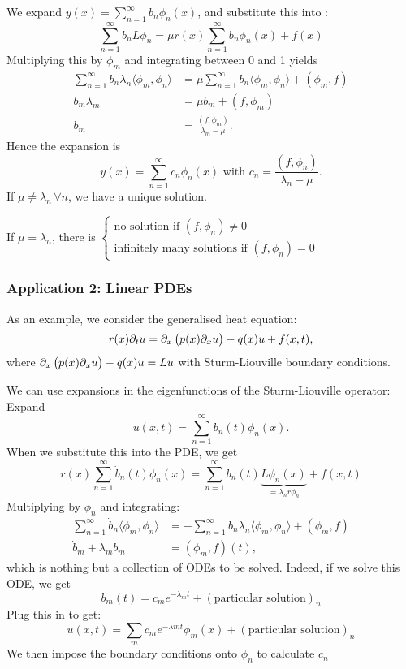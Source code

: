 We expand $y(x) = \sum_{n=1}^{\infty} b_n \phi_n(x)$,
and substitute this into :
\[
\sum_{n=1}^{\infty} b_n L \phi_n = \mu r(x) \sum_{n=1}^{\infty} b_n \phi_n(x) + f(x)
\]
Multiplying this by $\phi_m$ and integrating between 0 and 1 yields
\begin{align*}
	\sum_{n=1}^{\infty} b_n \lambda_n \langle \phi_m, \phi_n\rangle &= \mu \sum_{n=1}^{\infty} b_n \langle \phi_m, \phi_n\rangle + (\phi_m, f) \\
	b_m \lambda_m &= \mu b_m + (f, \phi_m) \\
	b_m &= \frac{(f, \phi_m)}{\lambda_m - \mu}.
\end{align*}
Hence the expansion is
\[
y(x) = \sum^{\infty}_{n=1} c_n \phi_n(x) \text{ with } c_n = \frac{(f, \phi_n)}{\lambda_n - \mu}.
\]
If $\mu \neq \lambda_n \,\forall n$, we have a unique solution.

If $\mu = \lambda_n$, there is $\begin{cases} \text{no solution if } (f, \phi_n) \neq 0 \\ \text{infinitely many solutions if } (f, \phi_n) = 0 \end{cases}$

\subsubsection*{Application 2: Linear PDEs}

\begin{eg}
	As an example, we consider the generalised heat equation:
	\[
	r(x) \partial_t u = \partial_x\left(p(x) \partial_x u\right) - q(x) u + f(x,t),
	\]
	where $\partial_x\left(p(x) \partial_x u\right) - q(x) u = Lu$ with Sturm-Liouville boundary conditions.
	
	We can use expansions in the eigenfunctions of the Sturm-Liouville operator: Expand
	\[
	u(x,t) = \sum_{n=1}^{\infty} b_n(t) \phi_n(x).
	\]
	When we substitute this into the PDE, we get
	\[
	r(x) \sum_{n=1}^{\infty} \dot{b}_n(t) \phi_n(x) = \sum_{n=1}^{\infty} b_n(t) \underbrace{L \phi_n(x)}_{=\lambda_nr\phi_n} + f(x,t)
	\]
	Multiplying by $\phi_n$ and integrating:
	\begin{align*}
		\sum_{n=1}^{\infty} \dot{b}_n \langle \phi_m, \phi_n\rangle &= - \sum_{n=1}^{\infty} b_n \lambda_n \langle \phi_m, \phi_n\rangle + (\phi_m, f) \\
		\dot{b}_m + \lambda_m b_m &= (\phi_m, f)(t),
	\end{align*}
	which is nothing but a collection of ODEs to be solved. Indeed, if we solve this ODE, we get
	\[
	b_m(t) = c_m e^{-\lambda_m t} + (\text{particular solution})_n
	\]
	Plug this in to get:
	\[
	u(x,t) = \sum_m c_m e^{-\lambda m t} \phi_m(x) + (\text{particular solution})_n
	\]
	We then impose the boundary conditions onto $\phi_n$ to calculate $c_n$
\end{eg}

